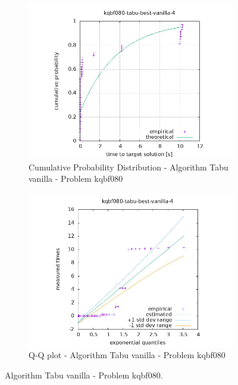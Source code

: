 \begin{figure}[H]
    \centering
    \begin{subfigure}{0.49\textwidth}
        \includegraphics[width=\textwidth]{figure/ttt_plot/kqbf080-tabu-best-vanilla-4-exp.jpeg}
        \caption{Cumulative Probability Distribution - Algorithm Tabu vanilla - Problem kqbf080}
        \label{fig:tabu-vanilla-kqbf080-exp}
    \end{subfigure}
    \hfill
    \begin{subfigure}{0.49\textwidth}
        \includegraphics[width=\textwidth]{figure/ttt_plot/kqbf080-tabu-best-vanilla-4-qq.jpeg}
        \caption{Q-Q plot - Algorithm Tabu vanilla - Problem kqbf080}
        \label{fig:tabu-vanilla-kqbf080-qq}
    \end{subfigure}
    \caption{Algorithm Tabu vanilla - Problem kqbf080.}
    \label{fig:tabu-vanilla-kqbf080}
\end{figure}



